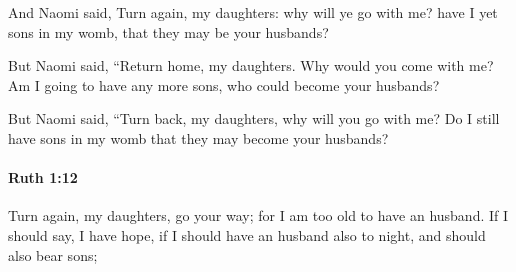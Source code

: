 			\begin{versebox}
					\item[BHS] 
					\item[LXX] 
					\item[ASV] And Naomi said, Turn again, my daughters: why will ye go with me? have I yet sons in my womb, that they may be your husbands?
					\item[NIV] But Naomi said, “Return home, my daughters. Why would you come with me? Am I going to have any more sons, who could become your husbands?
					\item[NRSV] But Naomi said, “Turn back, my daughters, why will you go with me? Do I still have sons in my womb that they may become your husbands?
			\end{versebox}

		\paragraph{Ruth 1:12} %
			\label{RUTH-1-12}

			Turn again, my daughters, go your way; for I am too old to have an husband. If I should say, I have hope, if I should have an husband also to night, and should also bear sons;

